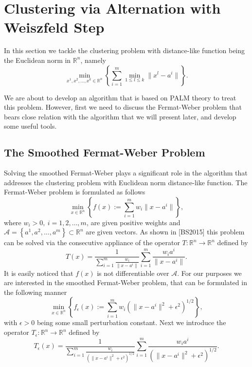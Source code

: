 \documentclass[11pt]{article}
\numberwithin{equation}{section}
\begin{document}
\section{Clustering via Alternation with Weiszfeld Step}

In this section we tackle the clustering problem with distance-like function being the Euclidean norm in $\mathbb{R}^n$, namely
\begin{equation}
	\min_{x^1, x^2, \ldots, x^k \in \mathbb{R}^n} \left\lbrace \sum\limits_{i=1}^{m} \min\limits_{1 \leq l \leq k} \|x^l - a^i\| \right\rbrace . \label{StateEq30}
\end{equation}

We are about to develop an algorithm that is based on PALM theory to treat this problem. However, first we need to discuss the Fermat-Weber problem that bears close relation with the algorithm that we will present later, and develop some useful tools.

\subsection{The Smoothed Fermat-Weber Problem}
Solving the smoothed Fermat-Weber plays a significant role in the algorithm that addresses the clustering problem with Euclidean norm distance-like function.
The Fermat-Weber problem is formulated as follows
\begin{equation}
	\min_{x \in \mathbb{R}^n} \left\lbrace f(x) := \sum\limits_{i=1}^{m} w_i\|x - a^i\| \right\rbrace , \label{StateEq60}
\end{equation}
where $w_i>0, \: i=1,2, \ldots, m$, are given positive weights and $\mathcal{A} = \left\lbrace a^1, a^2, \ldots, a^m \right\rbrace \subset \mathbb{R}^n$ are given vectors. As shown in [BS2015] this problem can be solved via the consecutive appliance of the operator $T: \mathbb{R}^n \rightarrow \mathbb{R}^n$ defined by
\begin{equation*}
	T(x) = \frac{1}{\sum\limits_{i=1}^{m}\frac{w_i}{\|x - a^i\|}} \sum\limits_{i=1}^{m}\frac{w_i a^i}{\|x - a^i\|} .
\end{equation*}
It is easily noticed that $f(x)$ is not differentiable over $\mathcal{A}$. For our purposes we are interested in the smoothed Fermat-Weber problem, that can be formulated in the following manner
\begin{equation}
	\min_{x \in \mathbb{R}^n} \left\lbrace f_{\epsilon}(x) := \sum\limits_{i=1}^{m} w_i \left( \|x - a^i\|^2 + {\epsilon}^2 \right)^{1/2} \right\rbrace , \label{StateEq61}
\end{equation}
with $\epsilon > 0$ being some small perturbation constant. Next we introduce the operator $T_{\epsilon}: \mathbb{R}^n \rightarrow \mathbb{R}^n$ defined by 
\begin{equation*}
	T_{\epsilon}(x) = \frac{1}{\sum\limits_{i=1}^{m}\frac{w_i}{\left( \|x - a^i\|^2 + {\epsilon}^2 \right)^{1/2}}} \sum\limits_{i=1}^{m}\frac{w_i a^i}{\left( \|x - a^i\|^2 + {\epsilon}^2 \right)^{1/2}} .
\end{equation*}
\end{document}
